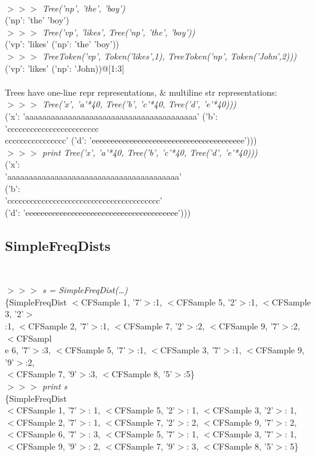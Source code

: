 \documentclass[11pt]{article}
\begin{document}
{\tt
\begin{tabbing}
\emph{$>>>$ Tree('np', 'the', 'boy')}\\
('np': 'the' 'boy') \\
\emph{$>>>$ Tree('vp', 'likes', Tree('np', 'the', 'boy'))}\\
('vp': 'likes' ('np': 'the' 'boy'))\\
\emph{$>>>$ TreeToken('vp', Token('likes',1), TreeToken('np', Token('John',2)))}\\
('vp': 'likes' ('np': 'John))@[1:3]\\
\\
\textrm{Trees have one-line repr representations, \& multiline str representations:}\\
\emph{$>>>$ Tree('x', 'a'*40, Tree('b', 'c'*40, Tree('d', 'e'*40)))}\\
('x': 'aaaaaaaaaaaaaaaaaaaaaaaaaaaaaaaaaaaaaaaa' ('b': 'cccccccccccccccccccccccc\\
cccccccccccccccc' ('d': 'eeeeeeeeeeeeeeeeeeeeeeeeeeeeeeeeeeeeeeee')))\\
\emph{$>>>$ print Tree('x', 'a'*40, Tree('b', 'c'*40, Tree('d', 'e'*40)))}\\
('x':\\
\qquad  'aaaaaaaaaaaaaaaaaaaaaaaaaaaaaaaaaaaaaaaa'\\
\qquad  ('b':\\
\qquad\qquad    'cccccccccccccccccccccccccccccccccccccccc'\\
\qquad\qquad    ('d': 'eeeeeeeeeeeeeeeeeeeeeeeeeeeeeeeeeeeeeeee')))
\end{tabbing}
}

\subsection{SimpleFreqDists}


{\tt
\begin{tabbing}
\emph{$>>>$ s = SimpleFreqDist(\ldots)}\\
\{SimpleFreqDist $<$CFSample 1, '7'$>$:1, $<$CFSample 5, '2'$>$:1, $<$CFSample 3, '2'$>$\\
:1, $<$CFSample 2, '7'$>$:1, $<$CFSample 7, '2'$>$:2, $<$CFSample 9, '7'$>$:2, $<$CFSampl\\
e 6, '7'$>$:3, $<$CFSample 5, '7'$>$:1, $<$CFSample 3, '7'$>$:1, $<$CFSample 9, '9'$>$:2,\\
 $<$CFSample 7, '9'$>$:3, $<$CFSample 8, '5'$>$:5\}\\
\emph{$>>>$ print s}\\
\{SimpleFreqDist\\
\qquad $<$CFSample 1, '7'$>$: 1, $<$CFSample 5, '2'$>$: 1, $<$CFSample 3, '2'$>$: 1, \\
\qquad $<$CFSample 2, '7'$>$: 1, $<$CFSample 7, '2'$>$: 2, $<$CFSample 9, '7'$>$: 2, \\
\qquad $<$CFSample 6, '7'$>$: 3, $<$CFSample 5, '7'$>$: 1, $<$CFSample 3, '7'$>$: 1, \\
\qquad $<$CFSample 9, '9'$>$: 2, $<$CFSample 7, '9'$>$: 3, $<$CFSample 8, '5'$>$: 5\}
\end{tabbing}
}
\end{document}

